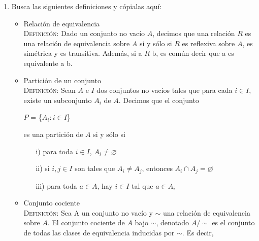 \documentclass[letterpaper,11pt]{article}
\begin{document}
\begin{enumerate}
\begin{proof}
            En ambos casos se llega a una contradicción, así $A_{0}$ no
            pertenece a la imagen de $f$ y por lo tanto $f$ no es suprayectiva.
            
        \end{proof}
        
        \item Busca las siguientes definiciones y cópialas aquí:
        
        \begin{itemize}
            
            \item Relación de equivalencia \\
            \textsc{Definición:} Dado un conjunto no vacío $A$, decimos que una
            relación $R$ es una relación de equivalencia sobre $A$ si y sólo si
            $R$ es reflexiva sobre $A$, es simétrica y es transitiva. Además,
            si a $R$ b, es común decir que a es equivalente a b.
            
            \item Partición de un conjunto \\
            \textsc{Definición:} Sean $A$ e $I$ dos conjuntos no vacíos tales
            que para cada $i \in I$, existe un subconjunto $A_i$ de $A$.
            Decimos que el conjunto
            
            \begin{center}
                $P$ = \{$A_i : i \in I$\}
            \end{center}
            
            es una partición de $A$ si y sólo si
            
            \begin{itemize}
                
                \item[i)] para toda $i \in I$, $A_i \neq \varnothing$
                \item[ii)] si $i, j \in I$ son tales que $A_i \neq A_j$,
                entonces $A_i \cap A_j = \varnothing$
                \item[iii)] para toda $a \in A$, hay $i \in I$ tal que
                $a \in A_i$
                
            \end{itemize}
            
            \item Conjunto cociente \\
            \textsc{Definición:} Sea A un conjunto no vacío y $\sim$ una
            relación de equivalencia sobre $A$. El conjunto cociente de $A$
            bajo $\sim$, denotado $A /\sim$ es el conjunto de todas las clases
            de equivalencia inducidas por $\sim$.
            Es decir,
            

\end{itemize}
\end{enumerate}
\end{document}
